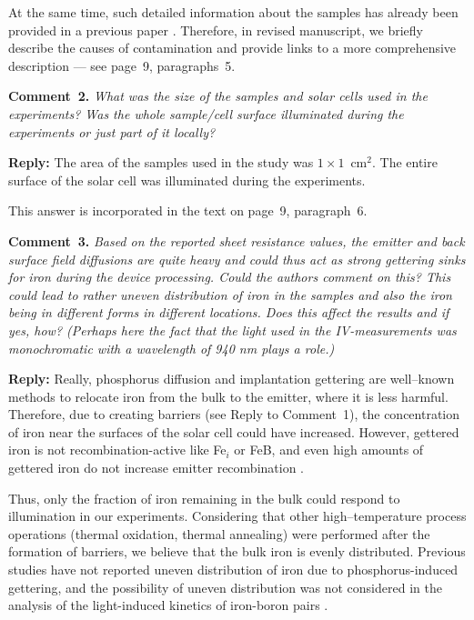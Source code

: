 \documentclass{WileyMSP-template}
\begin{document}
At the same time, such detailed information about the samples has already been provided in a previous paper \cite{Olikh2021JAP}.
Therefore, in revised manuscript, we briefly describe the causes of contamination and provide links
to a more comprehensive description --- see page~9, paragraphs~5.


\vspace{1cm}
\noindent
\textcolor[rgb]{0.00,0.50,1.00}{\textbf{Comment~2.}}
\emph{What was the size of the samples and solar cells used in the experiments?
Was the whole sample/cell surface illuminated during the experiments or just part of it locally?}

\noindent
\textcolor[rgb]{0.51,0.00,0.00}{\textbf{Reply:}}
The area of the samples used in the study was $1\times1$~cm$^2$.
The entire surface of the solar cell was illuminated during the experiments.

This answer is incorporated in the text on page~9, paragraph~6.


\vspace{1cm}
\noindent
\textcolor[rgb]{0.00,0.50,1.00}{\textbf{Comment~3.}}
\emph{Based on the reported sheet resistance values,
the emitter and back surface field diffusions are quite heavy and could thus act as strong gettering sinks for iron during the device processing.
Could the authors comment on this?
This could lead to rather uneven distribution of iron in the samples and also the iron being in different forms in different locations.
Does this affect the results and if yes, how?
(Perhaps here the fact that the light used in the IV-measurements was monochromatic with a wavelength of 940 nm plays a role.)}

\noindent
\textcolor[rgb]{0.51,0.00,0.00}{\textbf{Reply:}}
Really, phosphorus diffusion \cite{FeB:Vahanissi} and implantation \cite{LaineIEEEPV2016,FeBKin2019} gettering
are well--known methods to relocate iron from the bulk to the emitter, where it is less harmful.
Therefore, due to creating barriers (see Reply to Comment~1), the concentration of iron near the surfaces of the solar cell could have increased.
However, gettered iron is not recombination-active like
Fe$_i$ or FeB, and even high amounts of gettered iron do not increase emitter recombination \cite{FeB:Vahanissi}.

Thus, only the fraction of iron remaining in the bulk could respond to illumination in our experiments.
Considering that other high--temperature process operations (thermal oxidation, thermal annealing) were performed after the formation of barriers,
we believe that the bulk iron is evenly distributed.
Previous studies have not reported uneven distribution of iron due to phosphorus-induced gettering,
and the possibility of uneven distribution was not considered in the analysis of the light-induced kinetics of iron-boron pairs \cite{LaineIEEEPV2016,FeBKin2019}.
\end{document}
